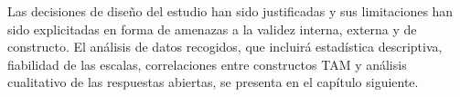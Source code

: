 Las decisiones de diseño del estudio han sido justificadas y sus limitaciones han sido explicitadas en forma de amenazas a la validez interna, externa y de constructo. El análisis de datos recogidos, que incluirá estadística descriptiva, fiabilidad de las escalas, correlaciones entre constructos TAM y análisis cualitativo de las respuestas abiertas, se presenta en el capítulo siguiente. 

